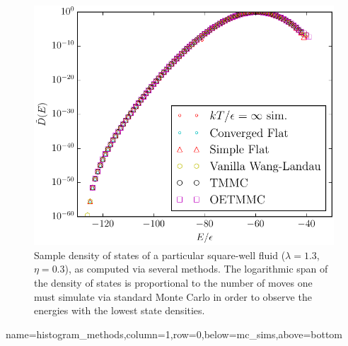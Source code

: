\documentclass[paperwidth=48in,paperheight=36in,
fontscale=0.27,margin=0.75in]{baposter}
\begin{document}
\begin{poster}
{    \begin{figure}[H]
      \centering
      \includegraphics[width=0.55\columnwidth]
      {figs/dos-poster-example.pdf}
      \caption{Sample density of states of a particular square-well
        fluid ($\lambda=1.3$, $\eta=0.3$), as computed via several
        methods. The logarithmic span of the density of states is
        proportional to the number of moves one must simulate via
        standard Monte Carlo in order to observe the energies with the
        lowest state densities.}
      \label{fig:dos}
    \end{figure}

  }

  {name=histogram_methods,column=1,row=0,below=mc_sims,above=bottom} {%




}
\end{poster}
\end{document}
